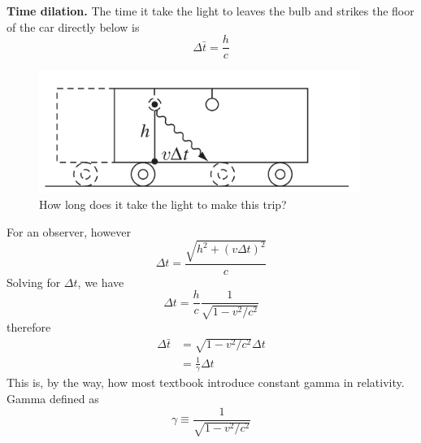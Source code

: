 \documentclass[../main.tex]{subfiles}
\begin{document}
\textbf{Time dilation.} The time it take the light to leaves the bulb and strikes the floor of the car directly below is
\begin{equation*}
    \Delta \bar{t}=\frac{h}{c}
\end{equation*}
\begin{figure}
    \centering
    \includegraphics[height=4cm]{../Rss/Relativity/TimeDilatation.png}
    \caption*{How long does it take the light to make this trip?}
\end{figure}
For an observer, however
\begin{equation*}
    \Delta t=\frac{\sqrt{h^2+(v\Delta t)^2}}{c}
\end{equation*}
Solving for $\Delta t$, we have
\begin{equation*}
    \Delta t=\frac{h}{c}\frac{1}{\sqrt{1-v^2/c^2}}
\end{equation*}
therefore
\begin{align*}
    \Delta \bar{t}&=\sqrt{1-v^2/c^2} \Delta t\\
    &=\frac{1}{\gamma} \Delta t
\end{align*}
This is, by the way, how most textbook introduce constant gamma in relativity. Gamma defined as 
\begin{equation*}
    \gamma\equiv\frac{1}{\sqrt{1-v^2/c^2}}
\end{equation*}
\end{document}

